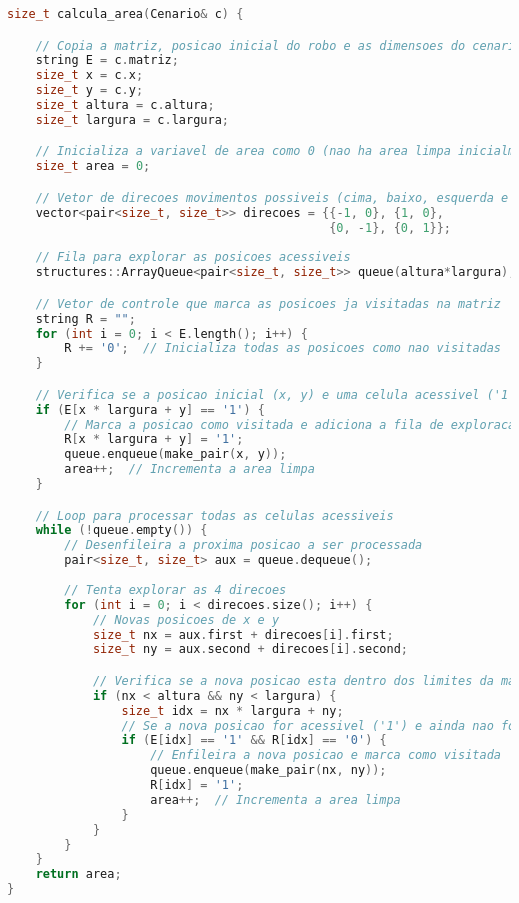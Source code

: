\begin{lstlisting}[language=c++]
size_t calcula_area(Cenario& c) {

    // Copia a matriz, posicao inicial do robo e as dimensoes do cenario
    string E = c.matriz;
    size_t x = c.x;
    size_t y = c.y;
    size_t altura = c.altura;
    size_t largura = c.largura;

    // Inicializa a variavel de area como 0 (nao ha area limpa inicialmente)
    size_t area = 0;

    // Vetor de direcoes movimentos possiveis (cima, baixo, esquerda e direita)
    vector<pair<size_t, size_t>> direcoes = {{-1, 0}, {1, 0}, 
                                             {0, -1}, {0, 1}};
    
    // Fila para explorar as posicoes acessiveis
    structures::ArrayQueue<pair<size_t, size_t>> queue(altura*largura);

    // Vetor de controle que marca as posicoes ja visitadas na matriz
    string R = "";
    for (int i = 0; i < E.length(); i++) {
        R += '0';  // Inicializa todas as posicoes como nao visitadas
    }

    // Verifica se a posicao inicial (x, y) e uma celula acessivel ('1')
    if (E[x * largura + y] == '1') {
        // Marca a posicao como visitada e adiciona a fila de exploracao
        R[x * largura + y] = '1';
        queue.enqueue(make_pair(x, y));
        area++;  // Incrementa a area limpa
    }

    // Loop para processar todas as celulas acessiveis
    while (!queue.empty()) {
        // Desenfileira a proxima posicao a ser processada
        pair<size_t, size_t> aux = queue.dequeue();
        
        // Tenta explorar as 4 direcoes
        for (int i = 0; i < direcoes.size(); i++) {
            // Novas posicoes de x e y
            size_t nx = aux.first + direcoes[i].first;
            size_t ny = aux.second + direcoes[i].second;  

            // Verifica se a nova posicao esta dentro dos limites da matriz
            if (nx < altura && ny < largura) {
                size_t idx = nx * largura + ny; 
                // Se a nova posicao for acessivel ('1') e ainda nao foi visitada
                if (E[idx] == '1' && R[idx] == '0') {
                    // Enfileira a nova posicao e marca como visitada
                    queue.enqueue(make_pair(nx, ny));
                    R[idx] = '1';
                    area++;  // Incrementa a area limpa
                }
            }
        }
    }
    return area;
}
\end{lstlisting}

